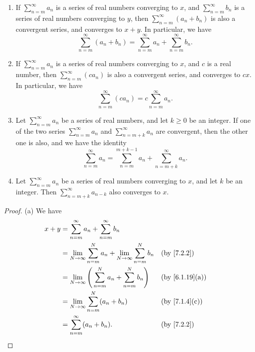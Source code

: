 \setcounter{thm}{13}
\begin{prop}\label{7.2.14}
  \mbox{}
  \begin{enumerate}
    \item If \(\sum_{n = m}^\infty a_n\) is a series of real numbers converging to \(x\), and \(\sum_{n = m}^\infty b_n\) is a series of real numbers converging to \(y\), then \(\sum_{n = m}^\infty (a_n + b_n)\) is also a convergent series, and converges to \(x + y\).
          In particular, we have
          \[
            \sum_{n = m}^\infty (a_n + b_n) = \sum_{n = m}^\infty a_n + \sum_{n = m}^\infty b_n.
          \]
    \item If \(\sum_{n = m}^\infty a_n\) is a series of real numbers converging to \(x\), and \(c\) is a real number, then \(\sum_{n = m}^\infty (c a_n)\) is also a convergent series, and converges to \(cx\).
          In particular, we have
          \[
            \sum_{n = m}^\infty (c a_n) = c \sum_{n = m}^\infty a_n.
          \]
    \item Let \(\sum_{n = m}^\infty a_n\) be a series of real numbers, and let \(k \geq 0\) be an integer.
          If one of the two series \(\sum_{n = m}^\infty a_n\) and \(\sum_{n = m + k}^\infty a_n\) are convergent, then the other one is also, and we have the identity
          \[
            \sum_{n = m}^\infty a_n = \sum_{n = m}^{m + k - 1} a_n + \sum_{n = m + k}^\infty a_n.
          \]
    \item Let \(\sum_{n = m}^\infty a_n\) be a series of real numbers converging to \(x\), and let \(k\) be an integer.
          Then \(\sum_{n = m + k}^\infty a_{n - k}\) also converges to \(x\).
  \end{enumerate}
\end{prop}

\begin{proof}{(a)}
  We have
  \begin{align*}
    x + y & = \sum_{n = m}^\infty a_n + \sum_{n = m}^\infty b_n                                                                 \\
          & = \lim_{N \to \infty} \sum_{n = m}^N a_n + \lim_{N \to \infty} \sum_{n = m}^N b_n &  & \by{7.2.2}                   \\
          & = \lim_{N \to \infty} \Bigg(\sum_{n = m}^N a_n + \sum_{n = m}^N b_n\Bigg)         &  & \text{(by \cref{6.1.19}(a))} \\
          & = \lim_{N \to \infty} \sum_{n = m}^N (a_n + b_n)                                  &  & \text{(by \cref{7.1.4}(c))}  \\
          & = \sum_{n = m}^\infty (a_n + b_n).                                                &  & \by{7.2.2}
  \end{align*}
\end{proof}

